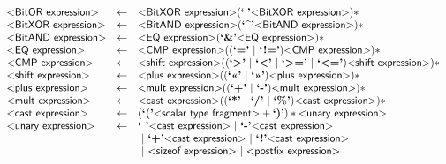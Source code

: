 \begin{figure}[h!]
\[\begin{array}{lcl}
  \text{\sf\textless BitOR expression\textgreater} & \gets & \text{\sf\textless BitXOR expression\textgreater} (\text{\bf`$|$'} \text{\sf\textless BitXOR expression\textgreater})*\\

  \text{\sf\textless BitXOR expression\textgreater} & \gets & \text{\sf\textless BitAND expression\textgreater} (\text{\bf`\textasciicircum'} \text{\sf\textless BitAND expression\textgreater})*\\

  \text{\sf\textless BitAND expression\textgreater} & \gets & \text{\sf\textless EQ expression\textgreater} (\text{\bf`\&'} \text{\sf\textless EQ expression\textgreater})*\\

  \text{\sf\textless EQ expression\textgreater} & \gets & \text{\sf\textless CMP expression\textgreater} ((\text{\bf`='}~|~\text{\bf`!='}) \text{\sf\textless CMP expression\textgreater})*\\

  \text{\sf\textless CMP expression\textgreater} & \gets & \text{\sf\textless shift expression\textgreater} (
               (\text{\bf`\textgreater'}
               ~|~\text{\bf`\textless'}
               ~|~\text{\bf`\textgreater='}
               ~|~\text{\bf`\textless='})
               \text{\sf\textless shift expression\textgreater})*\\

  \text{\sf\textless shift expression\textgreater} & \gets & \text{\sf\textless plus expression\textgreater} (
       (\text{\bf`\textless\textless'}~|~\text{\bf`\textgreater\textgreater'}) \text{\sf\textless plus expression\textgreater})*\\

  \text{\sf\textless plus expression\textgreater} & \gets & \text{\sf\textless mult expression\textgreater} ((\text{\bf`+'}~|~\text{\bf`-'}) \text{\sf\textless mult expression\textgreater})*\\

  \text{\sf\textless mult expression\textgreater} & \gets & \text{\sf\textless cast expression\textgreater} ((\text{\bf`*'}~|~\text{\bf`/'}~|~\text{\bf`\%'}) \text{\sf\textless cast expression\textgreater})*\\

  \text{\sf\textless cast expression\textgreater} & \gets & (\text{\bf`('} \text{\sf\textless scalar type fragment\textgreater}+ \text{\bf`)'})* \text{\sf\textless unary expression\textgreater}\\

  \text{\sf\textless unary expression\textgreater} & \gets & \text{\bf`~'} \text{\sf\textless cast expression\textgreater}
                              ~|~ \text{\bf`-'} \text{\sf\textless cast expression\textgreater}\\&&
                              ~|~ \text{\bf`+'} \text{\sf\textless cast expression\textgreater}
                              ~|~ \text{\bf`!'} \text{\sf\textless cast expression\textgreater}\\&&
                              ~|~ \text{\sf\textless sizeof expression\textgreater}
                              ~|~ \text{\sf\textless postfix expression\textgreater}\\


\end{array}\]
\end{figure}
